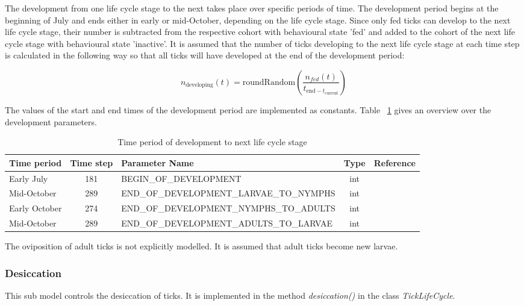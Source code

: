 \documentclass[a4paper, 11pt]{scrartcl}
\begin{document}
The development from one life cycle stage to the next takes place over specific periods of time. The development period begins at the beginning of July and ends either in early
or mid-October, depending on the life cycle stage. Since only fed ticks can develop to the next life cycle stage, their number is subtracted from the respective cohort with
behavioural state 'fed' and added to the cohort of the next life  cycle stage with behavioural state 'inactive'. It is assumed that the number of ticks developing to the next
life cycle stage at each time step is calculated in the following way so that all ticks will have developed at the end of the development period:

\begin{equation}
n_{\text{developing}}(t) = \text{roundRandom}(\frac{n_{fed}(t)}{t_{\text{end} - t_{\text{current}}}})
\end{equation}

The values of the start and end times of the development period are implemented as constants. Table ~\ref{tab:development_parameters} gives an overview over the
development parameters.

\begin{table}[h!]
\caption{Time period of development to next life cycle stage}
\label{tab:development_parameters}
\begin{tabularx}{\textwidth}{lclcl}
\toprule
\textbf{Time period} 	& \textbf{Time step} & \textbf{Parameter Name}							& \textbf{Type}    & \textbf{Reference} \\
\midrule
Early July   			& 181   			 & \tiny{BEGIN\_OF\_DEVELOPMENT}					& int      & ~\cite{tba}   		\\
Mid-October     		& 289      			 & \tiny{END\_OF\_DEVELOPMENT\_LARVAE\_TO\_NYMPHS}	& int      & ~\cite{tba}      	\\
Early October    		& 274    			 & \tiny{END\_OF\_DEVELOPMENT\_NYMPHS\_TO\_ADULTS}	& int      & ~\cite{tba}     	\\
Mid-October     		& 289      			 & \tiny{END\_OF\_DEVELOPMENT\_ADULTS\_TO\_LARVAE}	& int      & ~\cite{tba}        \\
\bottomrule
\end{tabularx}
\end{table}

The oviposition of adult ticks is not explicitly modelled. It is assumed that adult ticks become new larvae.


\subsubsection{Desiccation}
This sub model controls the desiccation of ticks. It is implemented in the method \textit{desiccation()} in the class \textit{TickLifeCycle}.
\end{document}
